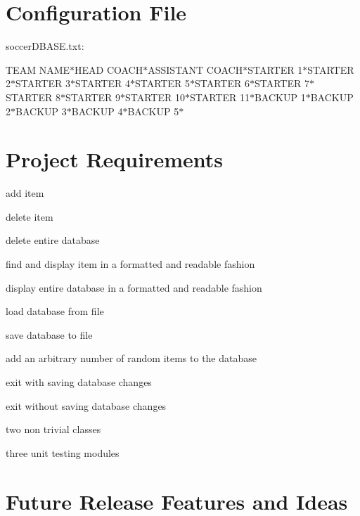  \hypertarget{index_sampleTextFile}{}\section{Configuration File}\label{index_sampleTextFile}
soccer\-D\-B\-A\-S\-E.\-txt\-:
\begin{DoxyItemize}
\item T\-E\-A\-M N\-A\-M\-E$\ast$\-H\-E\-A\-D C\-O\-A\-C\-H$\ast$\-A\-S\-S\-I\-S\-T\-A\-N\-T C\-O\-A\-C\-H$\ast$\-S\-T\-A\-R\-T\-E\-R 1$\ast$\-S\-T\-A\-R\-T\-E\-R 2$\ast$\-S\-T\-A\-R\-T\-E\-R 3$\ast$\-S\-T\-A\-R\-T\-E\-R 4$\ast$\-S\-T\-A\-R\-T\-E\-R 5$\ast$\-S\-T\-A\-R\-T\-E\-R 6$\ast$\-S\-T\-A\-R\-T\-E\-R 7$\ast$\-S\-T\-A\-R\-T\-E\-R 8$\ast$\-S\-T\-A\-R\-T\-E\-R 9$\ast$\-S\-T\-A\-R\-T\-E\-R 10$\ast$\-S\-T\-A\-R\-T\-E\-R 11$\ast$\-B\-A\-C\-K\-U\-P 1$\ast$\-B\-A\-C\-K\-U\-P 2$\ast$\-B\-A\-C\-K\-U\-P 3$\ast$\-B\-A\-C\-K\-U\-P 4$\ast$\-B\-A\-C\-K\-U\-P 5$\ast$
\end{DoxyItemize}



 \hypertarget{index_requirements}{}\section{Project Requirements}\label{index_requirements}

\begin{DoxyItemize}
\item add item
\item delete item
\item delete entire database
\item find and display item in a formatted and readable fashion
\item display entire database in a formatted and readable fashion
\item load database from file
\item save database to file
\item add an arbitrary number of random items to the database
\item exit with saving database changes
\item exit without saving database changes
\item two non trivial classes
\item three unit testing modules 

 
\end{DoxyItemize}\hypertarget{index_futureIdeas}{}\section{Future Release Features and Ideas}\label{index_futureIdeas}


